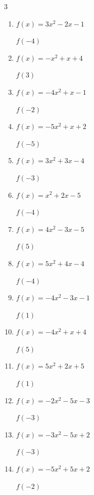 \begin{multicols}{3}
\begin{enumerate}
  \item $f(x)=3x^{2}-2x-1$

$f(-4)$
        \phantom{$= 55$}

  \item $f(x)=-x^{2}+x+4$

$f(3)$
        \phantom{$= -2$}

  \item $f(x)=-4x^{2}+x-1$

$f(-2)$
        \phantom{$= -19$}

\columnbreak %

  \item $f(x)=-5x^{2}+x+2$

$f(-5)$
        \phantom{$= -128$}

  \item $f(x)=3x^{2}+3x-4$

$f(-3)$
        \phantom{$= 14$}

  \item $f(x)=x^{2}+2x-5$

$f(-4)$
        \phantom{$= 3$}

  \item $f(x)=4x^{2}-3x-5$

$f(5)$
        \phantom{$= 80$}

  \item $f(x)=5x^{2}+4x-4$

$f(-4)$
        \phantom{$= 60$}

  \item $f(x)=-4x^{2}-3x-1$

$f(1)$
        \phantom{$= -8$}

  \item $f(x)=-4x^{2}+x+4$

$f(5)$
        \phantom{$= -91$}

  \item $f(x)=5x^{2}+2x+5$

$f(1)$
        \phantom{$= 12$}

  \item $f(x)=-2x^{2}-5x-3$

$f(-3)$
        \phantom{$= -6$}

  \item $f(x)=-3x^{2}-5x+2$

$f(-3)$
        \phantom{$= -10$}

  \item $f(x)=-5x^{2}+5x+2$

$f(-2)$
        \phantom{$= -28$}


\end{enumerate}
\end{multicols}
